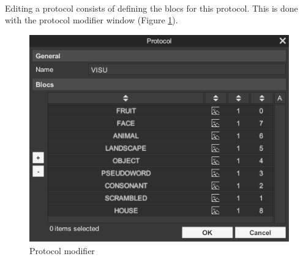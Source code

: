 \documentclass[a4paper]{article}
\begin{document}
\paragraph{} Editing a protocol consists of defining the blocs for this protocol. This is done with the protocol modifier window (Figure \ref{protocolModifierUI}).
\begin{figure}[H]
\begin{center}
\includegraphics[scale=0.5]{ProtocolModifier.png}
\end{center}
\caption{\label{protocolModifierUI}Protocol modifier}
\end{figure}
\end{document}
